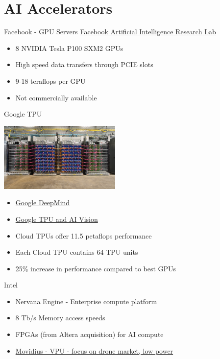 \documentclass[10pt]{beamer}
\begin{document}
\section{AI Accelerators}
\begin{frame}{Facebook - GPU Servers}
  \href{https://www.youtube.com/watch?v=-CRJLam3BNc}{Facebook Artificial Intelligence Research Lab}
  \begin{itemize}
  \item 8 NVIDIA Tesla P100 SXM2 GPUs
  \item High speed data transfers through PCIE slots
  \item 9-18 teraflops per GPU
  \item Not commercially available
  \end{itemize}
\end{frame}
\begin{frame}{Google TPU}
  \begin{center}
    \includegraphics[width=0.45\textwidth]{tpu.png}
  \end{center}
  \begin{itemize}
  \item \href{https://www.youtube.com/watch?v=TnUYcTuZJpM}{Google DeepMind}
  \item \href{https://www.theverge.com/2017/5/17/15649628/google-tensor-processing-unit-tensorflow-ai-training-system}{Google TPU and AI Vision}
  \item Cloud TPUs offer 11.5 petaflops performance
  \item Each Cloud TPU contains 64 TPU units
  \item 25\% increase in performance compared to best GPUs
  \end{itemize}
\end{frame}
\begin{frame}{Intel}
  \begin{itemize}
  \item Nervana Engine - Enterprise compute platform
  \item 8 Tb/s Memory access speeds
  \item FPGAs (from Altera acquisition) for AI compute
  \item \href{https://www.youtube.com/watch?v=hX0UELNRR1I}{Movidius - VPU - focus on drone market, low power}
  \end{itemize}
\end{frame}
\end{document}
